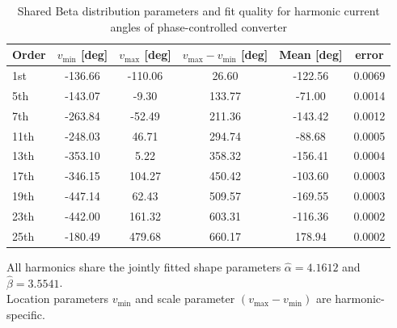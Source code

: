 \begin{table}[!t]
    \centering
    \caption{Shared Beta distribution parameters and fit quality for harmonic current angles of phase-controlled converter}
    \label{tab:beta_phase_params_pc}
    \scriptsize
    \setlength{\tabcolsep}{3pt}
    \begin{tabular}{l c c c c c}
    Order & $v_{\min}$ [deg] & $v_{\max}$ [deg] & $v_{\max}-v_{\min}$ [deg] & Mean [deg] & error \\
    \hline
    1st & -136.66 & -110.06 & 26.60 & -122.56 & 0.0069 \\
    5th & -143.07 & -9.30 & 133.77 & -71.00 & 0.0014 \\
    7th & -263.84 & -52.49 & 211.36 & -143.42 & 0.0012 \\
    11th & -248.03 & 46.71 & 294.74 & -88.68 & 0.0005 \\
    13th & -353.10 & 5.22 & 358.32 & -156.41 & 0.0004 \\
    17th & -346.15 & 104.27 & 450.42 & -103.60 & 0.0003 \\
    19th & -447.14 & 62.43 & 509.57 & -169.55 & 0.0003 \\
    23th & -442.00 & 161.32 & 603.31 & -116.36 & 0.0002 \\
    25th & -180.49 & 479.68 & 660.17 & 178.94 & 0.0002 \\
    \end{tabular}
    \vspace{2pt}
    \parbox{\columnwidth}{\scriptsize All harmonics share the jointly fitted shape parameters $\hat{\alpha}=4.1612$ and $\hat{\beta}=3.5541$. \\
    Location parameters $v_{\min}$ and scale parameter $(v_{\max} - v_{\min})$ are harmonic-specific.
    }
\end{table}


